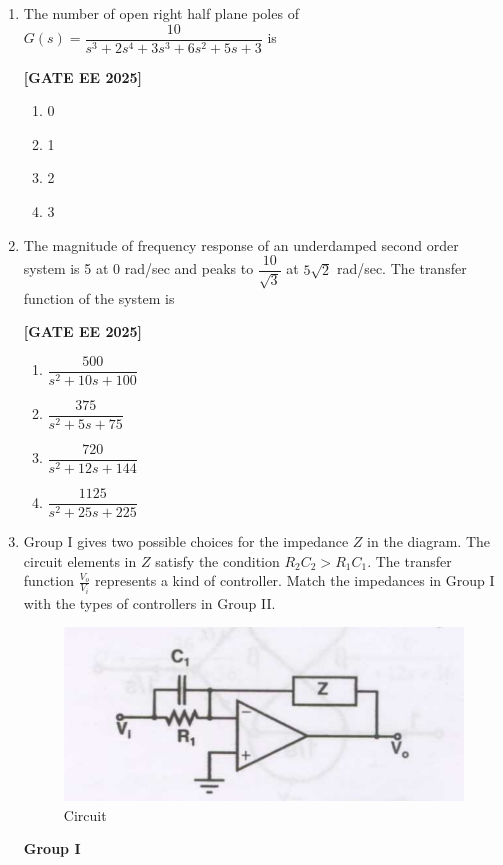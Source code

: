 \documentclass[12pt]{article}
\begin{document}
\begin{enumerate}[leftmargin=*, label=\textbf{Q.\arabic*:}]
\item The number of open right half plane poles of $G(s) = \dfrac{10}{s^3 + 2s^4 + 3s^3 + 6s^2 + 5s + 3}$ is
 
\noindent \textbf{[GATE EE 2025]}
\begin{enumerate}
  \item 0
  \item 1
  \item 2
  \item 3
\end{enumerate}

\item The magnitude of frequency response of an underdamped second order system is 5 at 0 rad/sec and peaks to $\dfrac{10}{\sqrt{3}}$ at $5 \sqrt{2}$ rad/sec. The transfer function of the system is
 
\noindent \textbf{[GATE EE 2025]}
\begin{enumerate}
  \item $\dfrac{500}{s^2 + 10s + 100}$
  \item $\dfrac{375}{s^2 + 5s + 75}$
  \item $\dfrac{720}{s^2 + 12s + 144}$
  \item $\dfrac{1125}{s^2 + 25s + 225}$
\end{enumerate}

\item
Group I gives two possible choices for the impedance $Z$ in the diagram. The circuit elements in $Z$ satisfy the condition $R_2C_2 > R_1C_1$. The transfer function $\frac{V_o}{V_i}$ represents a kind of controller. Match the impedances in Group I with the types of controllers in Group II.
\begin{figure}[H]\centering
\includegraphics[width=0.8\columnwidth]{figs/q43a.png}
\caption{Circuit}
\label{fig:q43a}
\end{figure}
\textbf{Group I}


\end{enumerate}
\end{document}

